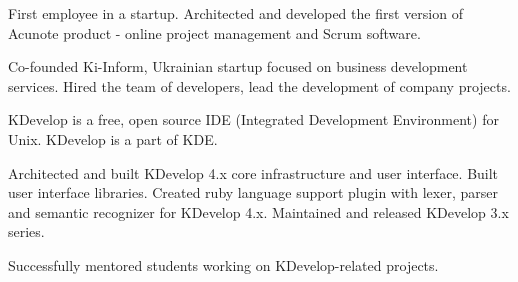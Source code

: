 \documentclass[12pt]{letter}
\begin{document}
\begin{llist}
  \endexperience


  \startexperience

           \item First employee in a startup. Architected and developed the first version
           of Acunote product - online project management and Scrum software.

  \endexperience


  \startexperience

           \item Co-founded Ki-Inform, Ukrainian startup focused on business development
           services. Hired the team of developers, lead the development of company projects.

  \endexperience




  \location{}

  \startexperience

           \item KDevelop is a free, open source IDE (Integrated Development Environment) for Unix.
           KDevelop is a part of KDE.

           \item Architected and built KDevelop 4.x core infrastructure and user interface.
           Built user interface libraries. Created ruby language support plugin with lexer,
           parser and semantic recognizer for KDevelop 4.x. Maintained and released
           KDevelop 3.x series.

  \endexperience

  \location{}

  \startexperience

           \item Successfully mentored students working on KDevelop-related projects.

  \endexperience


\end{llist}
\end{document}
